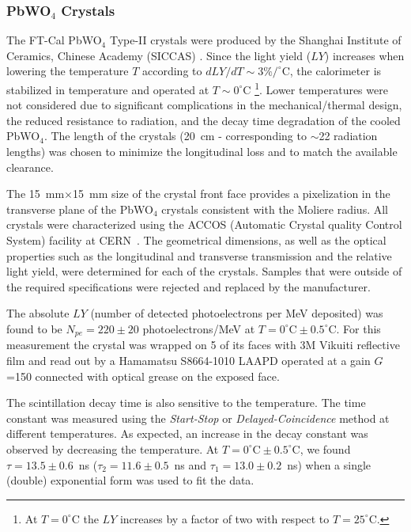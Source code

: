 \subsubsection{PbWO$_4$ Crystals}

The FT-Cal PbWO$_4$ Type-II crystals were produced by the Shanghai Institute of Ceramics, Chinese Academy
(SICCAS) \cite{tanja-siccas}. Since the light yield ($LY$) increases when lowering the temperature $T$ according to 
$dLY/dT \sim 3\%/^\circ$C, the calorimeter is stabilized in temperature and operated at
$T \sim 0^\circ$C \footnote{At $T = 0^\circ$C the $LY$ increases by a factor of two with respect to $T =25^\circ$C.}.
Lower temperatures were not considered due to significant complications in the mechanical/thermal design, the
reduced resistance to radiation,  and the decay time degradation of the cooled PbWO$_4$. The length of the
crystals (20~cm - corresponding to $\sim$22 radiation lengths) was chosen to minimize the longitudinal loss and to
match the available clearance.

The 15~mm$\times$15~mm size of the crystal front face provides a pixelization in the transverse plane of
the PbWO$_4$ crystals consistent with the Moliere radius. All crystals were characterized using the ACCOS
(Automatic Crystal quality Control System) facility at CERN~\cite{accos}. The geometrical dimensions, as well as the
optical properties such as the longitudinal and transverse transmission and the relative light yield, were determined
for each of the crystals. Samples that were outside of the required specifications were rejected and replaced by the
manufacturer. 

The absolute $LY$ (number of detected photoelectrons per MeV deposited) was found to be $N_{pe}=220\pm 20$
photoelectrons/MeV at $T=0^\circ\textrm{C}\pm 0.5^\circ\textrm{C}$. For this measurement the crystal was
wrapped on 5 of its faces with 3M Vikuiti reflective film and read out by a Hamamatsu S8664-1010 LAAPD
operated at a gain $G$=150 connected with optical grease on the exposed face. 

The scintillation decay time is also sensitive to the temperature. The time constant was measured using the
{\it Start-Stop} or {\it Delayed-Coincidence} method at different temperatures. As expected, an increase in the
decay constant was observed by decreasing the temperature. At $T=0^\circ\textrm{C}\pm 0.5^\circ\textrm{C}$, we
found $\tau=13.5\pm 0.6$~ns ($\tau_2=11.6\pm 0.5$~ns and $\tau_1=13.0\pm 0.2$~ns) when a single (double)
exponential form was used to fit the data.

